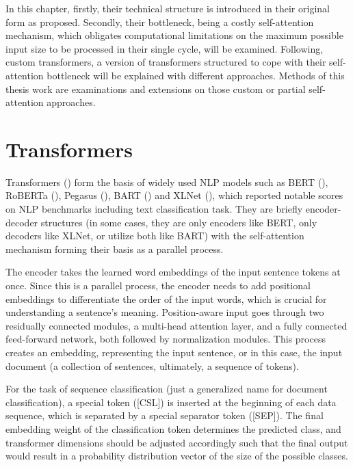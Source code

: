 \documentclass{iyte}
\begin{document}
In this chapter, firstly, their technical structure is introduced in their original form as \cite{attention_is_all_you_need} proposed. Secondly, their bottleneck, being a costly self-attention mechanism, which obligates computational limitations on the maximum possible input size to be processed in their single cycle, will be examined. Following, custom transformers, a version of transformers structured to cope with their self-attention bottleneck will be explained with different approaches. Methods of this thesis work are examinations and extensions on those custom or partial self-attention approaches.

\section{Transformers}

Transformers (\citealt{attention_is_all_you_need}) form the basis of widely used NLP models such as BERT (\citealt{BERT}), RoBERTa (\citealt{RoBERTa}), Pegasus (\citealt{Pegasus}), BART (\citealt{BART}) and XLNet (\citealt{XLNet}), which reported notable scores on NLP benchmarks including text classification task. They are briefly encoder-decoder structures (in some cases, they are only encoders like BERT, only decoders like XLNet, or utilize both like BART) with the self-attention mechanism forming their basis as a parallel process.

The encoder takes the learned word embeddings of the input sentence tokens at once. Since this is a parallel process, the encoder needs to add positional embeddings to differentiate the order of the input words, which is crucial for understanding a sentence's meaning. Position-aware input goes through two residually connected modules, a multi-head attention layer, and a fully connected feed-forward network, both followed by normalization modules. This process creates an embedding, representing the input sentence, or in this case, the input document (a collection of sentences, ultimately, a sequence of tokens).

For the task of sequence classification (just a generalized name for document classification), a special token ([CSL]) is inserted at the beginning of each data sequence, which is separated by a special separator token ([SEP]). The final embedding weight of the classification token determines the predicted class, and transformer dimensions should be adjusted accordingly such that the final output would result in a probability distribution vector of the size of the possible classes.
\end{document}
